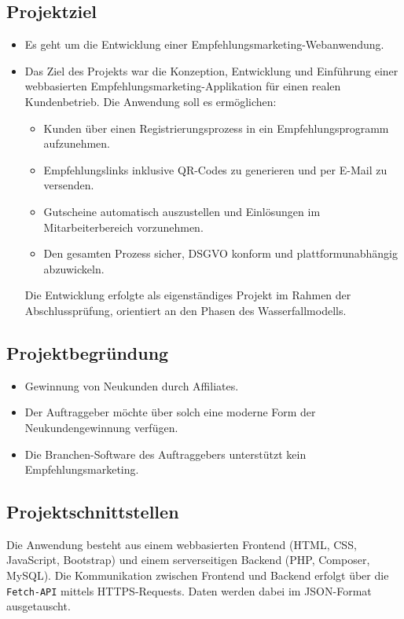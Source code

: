 \subsection{Projektziel} 
\label{sec:Projektziel}
\begin{itemize}
	\item Es geht um die Entwicklung einer Empfehlungsmarketing-Webanwendung.
	\item Das Ziel des Projekts war die Konzeption, Entwicklung und Einführung einer webbasierten Empfehlungsmarketing-Applikation für einen realen Kundenbetrieb.
    Die Anwendung soll es ermöglichen:
    \begin{itemize}
    \item Kunden über einen Registrierungsprozess in ein Empfehlungsprogramm aufzunehmen.
    \item Empfehlungslinks inklusive QR-Codes zu generieren und per E-Mail zu versenden.
    \item Gutscheine automatisch auszustellen und Einlösungen im Mitarbeiterbereich vorzunehmen.
    \item Den gesamten Prozess sicher, \acs{DSGVO} konform und plattformunabhängig abzuwickeln.    
    \end{itemize}
Die Entwicklung erfolgte als eigenständiges Projekt im Rahmen der Abschlussprüfung, orientiert an den Phasen des Wasserfallmodells.
\end{itemize}

\subsection{Projektbegründung} 
\label{sec:Projektbegruendung}
\begin{itemize}
	\item Gewinnung von Neukunden durch Affiliates.
	\item Der Auftraggeber möchte über solch eine moderne Form der Neukundengewinnung verfügen.
	\item Die Branchen-Software des Auftraggebers unterstützt kein Empfehlungsmarketing.
\end{itemize}


\subsection{Projektschnittstellen} 
\label{sec:Projektschnittstellen}
Die Anwendung besteht aus einem webbasierten Frontend (\ac{HTML}, \ac{CSS}, JavaScript, Bootstrap) und einem serverseitigen Backend (\ac{PHP}, Composer, MySQL).  
Die Kommunikation zwischen Frontend und Backend erfolgt über die \texttt{Fetch-API} mittels \ac{HTTPS}-Requests.  
Daten werden dabei im \ac{JSON}-Format ausgetauscht.  

